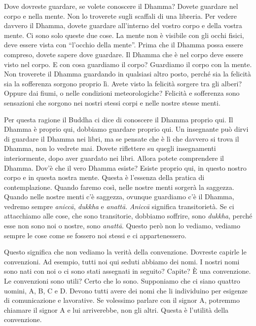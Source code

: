 Dove dovreste guardare, se volete conoscere il Dhamma? Dovete guardare
nel corpo e nella mente. Non lo troverete sugli scaffali di una
libreria. Per vedere davvero il Dhamma, dovete guardare all'interno del
vostro corpo e della vostra mente. Ci sono solo queste due cose. La
mente non è visibile con gli occhi fisici, deve essere vista con
``l'occhio della mente''. Prima che il Dhamma possa essere compreso,
dovete sapere dove guardare. Il Dhamma che è nel corpo deve essere visto
nel corpo. E con cosa guardiamo il corpo? Guardiamo il corpo con la
mente. Non troverete il Dhamma guardando in qualsiasi altro posto,
perché sia la felicità sia la sofferenza sorgono proprio lì. Avete visto
la felicità sorgere tra gli alberi? Oppure dai fiumi, o nelle condizioni
meteorologiche? Felicità e sofferenza sono sensazioni che sorgono nei
nostri stessi corpi e nelle nostre stesse menti.

Per questa ragione il Buddha ci dice di conoscere il Dhamma proprio qui.
Il Dhamma è proprio qui, dobbiamo guardare proprio qui. Un insegnante
può dirvi di guardare il Dhamma nei libri, ma se pensate che è lì che
davvero si trova il Dhamma, non lo vedrete mai. Dovete riflettere su
quegli insegnamenti interiormente, dopo aver guardato nei libri. Allora
potete comprendere il Dhamma. Dov'è che il vero Dhamma esiste? Esiste
proprio qui, in questo nostro corpo e in questa nostra mente. Questa è
l'essenza della pratica di contemplazione. Quando faremo così, nelle
nostre menti sorgerà la saggezza. Quando nelle nostre menti c'è
saggezza, ovunque guardiamo c'è il Dhamma, vedremo sempre \emph{aniccā},
\emph{dukkha} e \emph{anattā}. \emph{Aniccā} significa transitorietà. Se
ci attacchiamo alle cose, che sono transitorie, dobbiamo soffrire, sono
\emph{dukkha}, perché esse non sono noi o nostre, sono \emph{anattā}.
Questo però non lo vediamo, vediamo sempre le cose come se fossero noi
stessi e ci appartenessero.

Questo significa che non vediamo la verità della convenzione. Dovreste
capirle le convenzioni. Ad esempio, tutti noi qui seduti abbiamo dei
nomi. I nostri nomi sono nati con noi o ci sono stati assegnati in
seguito? Capite? È una convenzione. Le convenzioni sono utili? Certo che
lo sono. Supponiamo che ci siano quattro uomini, A, B, C e D. Devono
tutti avere dei nomi che li individuino per esigenze di comunicazione e
lavorative. Se volessimo parlare con il signor A, potremmo chiamare il
signor A e lui arriverebbe, non gli altri. Questa è l'utilità della
convenzione.

